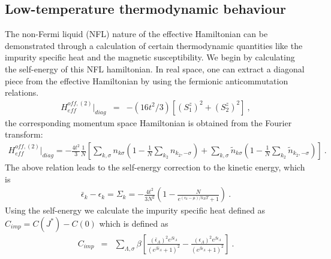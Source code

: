 \documentclass[12pt]{iopart}
\begin{document}
\subsection{Low-temperature thermodynamic behaviour}
The non-Fermi liquid (NFL) nature of the effective Hamiltonian can be demonstrated through a calculation of certain thermodynamic quantities like the impurity specific heat and the magnetic susceptibility. We begin by calculating the self-energy of this NFL hamiltonian. In real space, one can extract a diagonal piece from the effective Hamiltonian by using the fermionic anticommutation relations.
\begin{eqnarray}
H_{eff}^{off,(2)} |_{diag} &=& -(16t^2/3) [ (S_1^z)^2+ (S_2^z)^2 ] ~,
\end{eqnarray}
the corresponding momentum space Hamiltonian is obtained from the Fourier transform:
\begin{eqnarray}
H_{eff}^{off,(2)} |_{diag}= -\frac{4t^2}{3} \frac{1}{N} \left[ \displaystyle\sum_{k,\sigma} n_{k\sigma}(1-\frac{1}{N} \displaystyle\sum_{k_2}  n_{k_2,-\sigma}  ) + \displaystyle\sum_{k,\sigma} \tilde{n}_{k\sigma} ( 1-\frac{1}{N} \displaystyle\sum_{ k_2} \tilde{n}_{k_2,-\sigma}  ) \right]~.
\end{eqnarray}
The above relation leads to the self-energy correction to the kinetic energy, which is
\begin{eqnarray}
\bar{\epsilon} _k-\epsilon_k = \Sigma_k = -\frac{4t^2}{3N^2}\left(1-\frac{N}{e^{(\epsilon_k-\mu)/k_BT}+1}\right)~.
\label{eq:self-energy-NFL}
\end{eqnarray}
Using the self-energy we calculate the impurity specific heat defined as $C_{imp}=C(J^*)-C(0)$ which is defined as
\begin{eqnarray}
C_{imp} &=& \sum_{\Lambda,\sigma} \beta \left[ \frac{(\bar{\epsilon}_{\Lambda})^2 e^{\beta \bar{\epsilon}_{\Lambda}}}{( e^{\beta \bar{\epsilon}_{\Lambda}} +1)^2}  -\frac{({\epsilon}_{\Lambda})^2 e^{\beta {\epsilon}_{\Lambda}}}{( e^{\beta {\epsilon}_{\Lambda}} +1)^2} \right]~.
\end{eqnarray}
\end{document}
